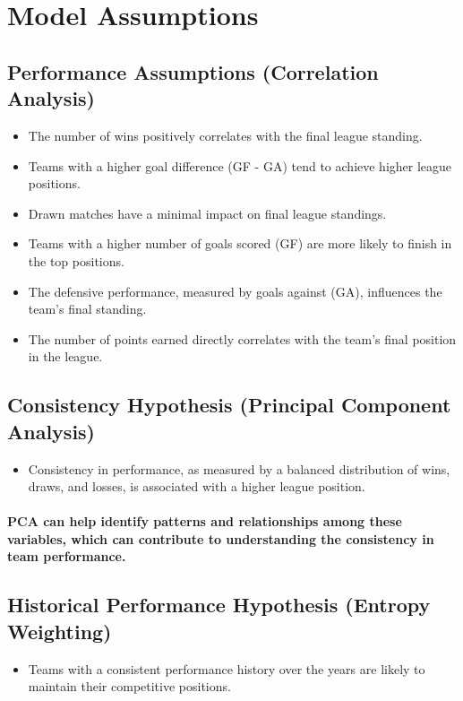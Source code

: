 \section{Model Assumptions}
% 
% 
% 
\subsection{Performance Assumptions (Correlation Analysis)}
\begin{itemize}
    \item  The number of wins positively correlates with the final league standing.
    \item  Teams with a higher goal difference (GF - GA) tend to achieve higher league positions.
    \item Drawn matches have a minimal impact on final league standings.
    \item Teams with a higher number of goals scored (GF) are more likely to finish in the top positions.
    \item  The defensive performance, measured by goals against (GA), influences the team's final standing.
    \item  The number of points earned directly correlates with the team's final position in the league.
\end{itemize}
\subsection{Consistency Hypothesis (Principal Component Analysis)}
% 
% 
% 
% 
\begin{itemize}
    \item Consistency in performance, as measured by a balanced distribution of wins, draws, and losses, is associated with a higher league position.
\end{itemize}
\paragraph{PCA can help identify patterns and relationships among these variables, which can contribute to understanding the consistency in team performance.}




\subsection{Historical Performance Hypothesis (Entropy Weighting)}
\begin{itemize}
    \item Teams with a consistent performance history over the years are likely to maintain their competitive positions.
\end{itemize}